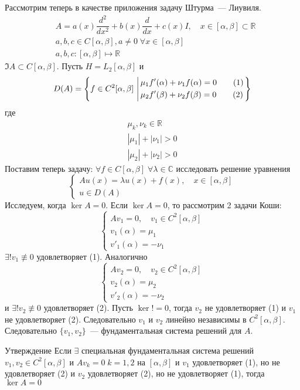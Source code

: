 \documentclass[14pt]{extarticle}
\begin{document}
Рассмотрим теперь в качестве приложения задачу Штурма~--- Лиувиля.
\begin{align*}
    &A = a(x)\dfrac{d^2}{dx^2} + b(x)\dfrac{d}{dx} + c(x)I,\quad x \in [\alpha, \beta] \subset 
    \mathbb R\\
    &a, b, c \in C[\alpha, \beta], a \ne 0\; \forall x \in [\alpha, \beta]\\
    &a, b, c : [\alpha, \beta] \mapsto \mathbb R
\end{align*}
$\Im A \subset C[\alpha, \beta]$.
Пусть $H = L_2[\alpha, \beta]$ и 
$$
D(A) = \left\{f \in C^2[\alpha, \beta] \left\arrowvert
\begin{aligned}
    &\mu_1f'(\alpha) + \nu_1f(\alpha) = 0 \qquad (1)\\
    &\mu_2  f'(\beta) + \nu_2  f(\beta) = 0 \qquad (2)
\end{aligned}
\right.
\right\}
$$
где
\begin{gather*}
    \mu_k, \nu_k \in \mathbb R\\
    |\mu_1| + |\nu_1| > 0\\
    |\mu_2| + |\nu_2| > 0
\end{gather*}
Поставим теперь задачу: $\forall f \in C[\alpha, \beta]\; \forall \lambda \in \mathbb C$
исследовать решение уравнения
$$
\left\{
\begin{array}{l}
    Au(x) = \lambda u(x) + f(x), \quad x \in [\alpha, \beta]\\
    u \in D(A)
\end{array}
\right.
$$
Исследуем, когда $\ker A = 0$.
Если $\ker A = 0$, то рассмотрим 2 задачи Коши:
$$
\left\{
\begin{array}{l}
    Av_1 = 0, \quad v_1 \in C^2[\alpha, \beta]\\
    v_1(\alpha) = \mu_1\\
    v'_1(\alpha) = -\nu_1
\end{array}
\right.
$$
$\exists! v_1 \not\equiv 0$ удовлетворяет (1).
Аналогично
$$
\left\{
\begin{array}{l}
    Av_2 = 0, \quad v_2 \in C^2[\alpha, \beta]\\
    v_2(\alpha) = \mu_2\\
    v'_2(\alpha) = -\nu_2
\end{array}
\right.
$$
и $\exists! v_2 \not\equiv 0$ удовлетворяет (2).
Пусть $\ker ! = 0$, тогда $v_2$ не удовлетворяет (1) и $v_1$ не удовлетворяет (2).
Следовательно $v_1$ и $v_2$ линейно независимы в $C^2[\alpha, \beta]$.
Следовательно $\{v_1, v_2\}$~--- фундаментальная система решений для $A$.
\begin{MathCl}{Утверждение}
    Если $\exists$ специальная фундаментальная система решений $v_1 ,v_2 \in C^2[\alpha,
    \beta]$ и $Av_k = 0\; k=1,2$ на $[\alpha, \beta]$ и $v_1$ удовлетворяет (1), но не
    удовлетворяет (2) и $v_2$ удовлетворяет (2), но не удовлетворяет (1), тогда
    $\ker A = 0$
\end{MathCl}
\end{document}
